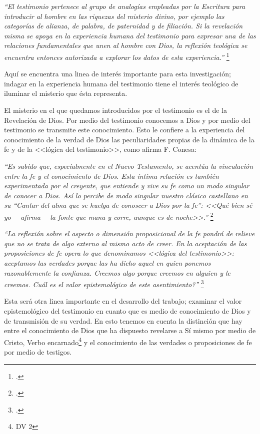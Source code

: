 \documentclass[12pt]{article}
\begin{document}
{\emph{``El testimonio pertenece al grupo de analogías empleadas por la Escritura para introducir al hombre en las riquezas del misterio divino, por ejemplo las categorías de alianza, de palabra, de paternidad y de filiación. Si la revelación misma se apoya en la experiencia humana del testimonio para expresar una de las relaciones fundamentales que unen al hombre con Dios, la reflexión teológica se encuentra entonces autorizada a explorar los datos de esta experiencia.''
}
\footcite[1523]{dicctf}

Aquí se encuentra una linea de interés importante para esta investigación; indagar en la experiencia humana del testimonio tiene el interés teológico de iluminar el misterio que ésta representa. 

El misterio en el que quedamos introducidos por el testimonio es el de la Revelación de Dios. Por medio del testimonio conocemos a Dios y por medio del testimonio se transmite este conocimiento. Esto le confiere a la experiencia del conocimiento de la verdad de Dios las peculiaridades propias de la dinámica de la fe y de la <<lógica del testimonio>>, como afirma F. Conesa:

\emph{
``Es sabido que, especialmente en el Nuevo Testamento, se acentúa la vinculación entre la fe y el conocimiento de Dios. Esta íntima relación es también experimentada por el creyente, que entiende y vive su fe como un modo singular de conocer a Dios. Así lo percibe de modo singular nuestro clásico castellano en su ``Cantar del alma que se huelga de conoscer a Dios por la fe'': <<Qué bien sé yo ---afirma--- la fonte que mana y corre, aunque es de noche>>.''}
\footcite[15]{cyc}


\emph{
``La reflexión sobre el aspecto o dimensión proposicional de la fe pondrá de relieve que no se trata de algo externo al mismo acto de creer. En la aceptación de las proposiciones de fe opera lo que denominamos <<lógica del testimonio>>: aceptamos las verdades porque las ha dicho aquel en quien ponemos razonablemente la confianza. Creemos algo porque creemos en alguien y le creemos. \textquestiondown Cuál es el valor epistemológico de este asentimiento?''}
\footcite[p.483]{feylogicaconesa}

Esta será otra linea importante en el desarrollo del trabajo; examinar el valor epistemológico del testimonio en cuanto que es medio de conocimiento de Dios y de transmisión de su verdad. En esto tenemos en cuenta la distinción que hay entre el conocimiento de Dios que ha dispuesto revelarse a Sí mismo por medio de Cristo, Verbo encarnado\footnote{DV 2} y el conocimiento de las verdades o proposiciones de fe por medio de testigos. 

}
\end{document}

